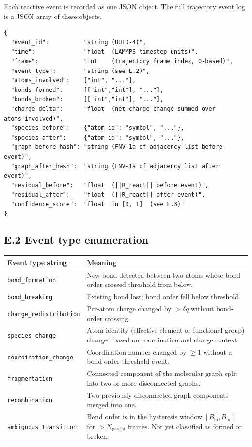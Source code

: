\documentclass[11pt, a4paper, oneside]{article}
\begin{document}
\begin{appendices}
Each reactive event is recorded as one JSON object.
The full trajectory event log is a JSON array of these objects.

\begin{lstlisting}[language={},caption={Reactive event record (JSON schema)}]
{
  "event_id":          "string (UUID-4)",
  "time":              "float  (LAMMPS timestep units)",
  "frame":             "int    (trajectory frame index, 0-based)",
  "event_type":        "string (see E.2)",
  "atoms_involved":    ["int", "..."],
  "bonds_formed":      [["int","int"], "..."],
  "bonds_broken":      [["int","int"], "..."],
  "charge_delta":      "float  (net charge change summed over atoms_involved)",
  "species_before":    {"atom_id": "symbol", "..."},
  "species_after":     {"atom_id": "symbol", "..."},
  "graph_before_hash": "string (FNV-1a of adjacency list before event)",
  "graph_after_hash":  "string (FNV-1a of adjacency list after event)",
  "residual_before":   "float  (||R_react|| before event)",
  "residual_after":    "float  (||R_react|| after event)",
  "confidence_score":  "float  in [0, 1]  (see E.3)"
}
\end{lstlisting}

\subsection*{E.2 Event type enumeration}

\begin{longtable}{p{5.5cm} p{9.0cm}}
  \toprule
  \textbf{Event type string} & \textbf{Meaning} \\
  \midrule
  \endhead
  \texttt{bond\_formation}        & New bond detected between two atoms whose
	bond order crossed threshold from below. \\
  \texttt{bond\_breaking}         & Existing bond lost; bond order fell below
	threshold. \\
  \texttt{charge\_redistribution} & Per-atom charge changed by $> \delta q$
	without bond-order crossing. \\
  \texttt{species\_change}        & Atom identity (effective element or
	functional group) changed based on coordination
	and charge context. \\
  \texttt{coordination\_change}   & Coordination number changed by $\geq 1$
	without a bond-order threshold event. \\
  \texttt{fragmentation}          & Connected component of the molecular
	graph split into two or more disconnected graphs. \\
  \texttt{recombination}          & Two previously disconnected graph
	components merged into one. \\
  \texttt{ambiguous\_transition}  & Bond order is in the hysteresis window
	$[B_{\mathrm{lo}}, B_{\mathrm{hi}}]$ for $> N_{\mathrm{persist}}$
	frames. Not yet classified as formed or broken. \\
  \bottomrule
\end{longtable}


\end{appendices}
\end{document}
